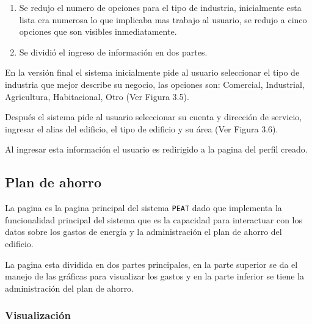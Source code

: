 \begin{enumerate}
\item Se redujo el numero de opciones para el tipo de industria, inicialmente
  esta lista era numerosa lo que implicaba mas trabajo al usuario, se redujo
  a cinco opciones que son visibles inmediatamente.
\item Se dividió el ingreso de información en dos partes.
\end{enumerate}

En la versión final el sistema inicialmente pide al usuario seleccionar el tipo
de industria que mejor describe su negocio, las opciones son: Comercial, Industrial,
Agricultura, Habitacional, Otro (Ver Figura 3.5).


Después el sistema pide al usuario seleccionar su cuenta y dirección
de servicio, ingresar el alias del edificio, el tipo de edificio y su área
(Ver Figura 3.6).


Al ingresar esta información el usuario es redirigido a la pagina
 del perfil creado.

\subsection{Plan de ahorro}

La pagina  es la pagina principal del sistema
\texttt{PEAT} dado que implementa la funcionalidad principal del sistema
que es la capacidad para interactuar con los datos sobre los gastos de
energía y la administración el plan de ahorro del edificio.

La pagina esta dividida en dos partes principales, en la parte superior
se da el manejo de las gráficas para visualizar los gastos y en la parte
inferior se tiene la administración del plan de ahorro.

\subsubsection{Visualización}


